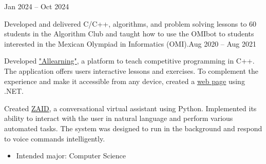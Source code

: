 \documentclass[10pt,a4paper,ragged2e,withhyper]{altacv}
\begin{document}

\makecvheader
{}
\begin{paracol}{2}


  {Jan 2024 -- Oct 2024}
  \divider

  {Developed and delivered C/C++, algorithms, and problem solving lessons to 60
  students in the Algorithm Club and
  taught how to use the OMIbot to students interested in the Mexican Olympiad
  in Informatics (OMI).}{Aug 2020 -- Aug 2021}


  {Developed {\href{https://github.com/KevinUrielAdler/Allearning}{\color{blue}"Allearning"\color{black}}},
  a platform to teach competitive programming in C++. The application offers users
  interactive lessons and exercises. To complement the experience and make it
  accessible from any device, created a
  {\href{https://github.com/KevinUrielAdler/Allearning-Web}{\color{blue}
  web page\color{black}}} using .NET.}
  \divider

  {Created {\href{https://github.com/KevinUrielAdler/AvZ}{\color{blue}
  ZAID\color{black}}}, a conversational virtual assistant using Python.
  Implemented its ability to interact with the user in natural language and
  perform various automated tasks. The system was designed to run in the
  background and respond to voice commands intelligently.}

  \begin{itemize}
    \item Intended major: Computer Science
  \end{itemize}
  \divider


\end{paracol}
\end{document}
